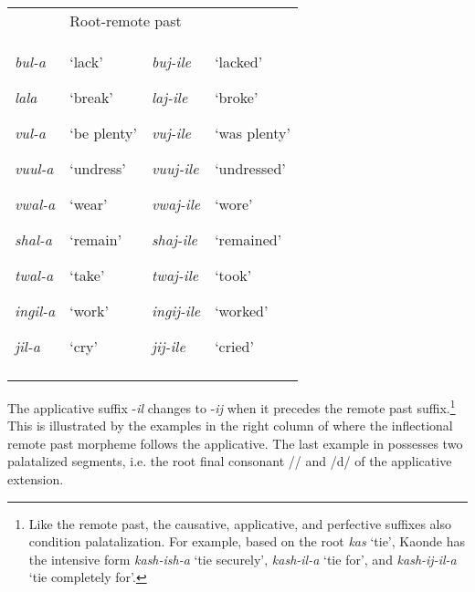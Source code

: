 \documentclass[output=paper]{langsci/langscibook}
\begin{document}
\begin{tabularx}{\textwidth}{XXXX}
\lsptoprule
\multicolumn{2}{l}{Root/stem-FV} & \multicolumn{2}{l}{Root-remote past}\\
{\emph{bul-a}}

{\emph{lala}}

{\emph{vul-a}}

{\emph{vuul-a}}

{\emph{vwal-a}}

{\emph{shal-a}}

{\emph{twal-a}}

{\emph{ingil-a}}

\emph{jil-a} & {‘lack’}

{‘break’}

{‘be plenty’}

{‘undress’}

{‘wear’}

{‘remain’}

{‘take’}

{‘work’}

‘cry’ & {\emph{buj-ile}}

{\emph{laj-ile}}

{\emph{vuj-ile}}

{\emph{vuuj-ile}}

{\emph{vwaj-ile}}

{\emph{shaj-ile}}

{\emph{twaj-ile} }

{\emph{ingij-ile}}

\emph{jij-ile} & {‘lacked’}

{‘broke’}

{‘was plenty’}

{‘undressed’}

{‘wore’}

{‘remained’}

{‘took’}

{‘worked’}

‘cried’\\
\lspbottomrule
\end{tabularx}
The applicative suffix -\emph{il} changes to -\emph{ij}\textit{ }when it precedes the remote past suffix.\footnote{ Like the remote past, the causative, applicative, and perfective suffixes also condition palatalization. For example, based on the root \textit{kas} ‘tie’, Kaonde has the intensive form \textit{kash-ish-a} ‘tie securely’, \textit{kash-il-a} ‘tie for’, and \textit{kash-ij-il-a} ‘tie completely for’. \par   \par } This is illustrated by the examples in the right column of  where the inflectional remote past morpheme follows the applicative. The last example in  possesses two palatalized segments, i.e. the root final consonant // and /d/ of the applicative extension. 
\end{document}
